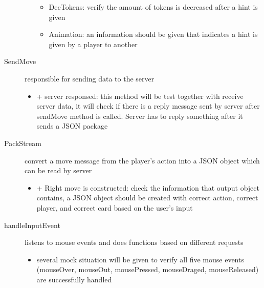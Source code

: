 \begin{description}
\begin{itemize}
\begin{itemize}
			\item DecTokens: verify the amount of tokens is decreased after a hint is given
			\item Animation: an information should be given that indicates a hint is given by a player to another
    			\end{itemize}
	\end{itemize}
	\item[SendMove] responsible for sending data to the server
	\begin{itemize}
		\item + server responsed: this method will be test together with receive server data, it will check if there is a reply message sent by server after sendMove method is called. Server has to reply something after it sends a JSON package
	\end{itemize}
	\item[PackStream] convert a move message from the player's action into a JSON object which can be read by server
	\begin{itemize}
		\item + Right move is constructed: check the information that output object contains, a JSON object should be created with correct action, correct player, and correct card based on the user's input
	\end{itemize}
	\item[handleInputEvent] listens to mouse events and does functions based on different requests
	\begin{itemize}
		\item several mock situation will be given to verify all five mouse events (mouseOver, mouseOut, mousePressed, mouseDraged, mouseReleased) are successfully handled
	\end{itemize}

\end{description}